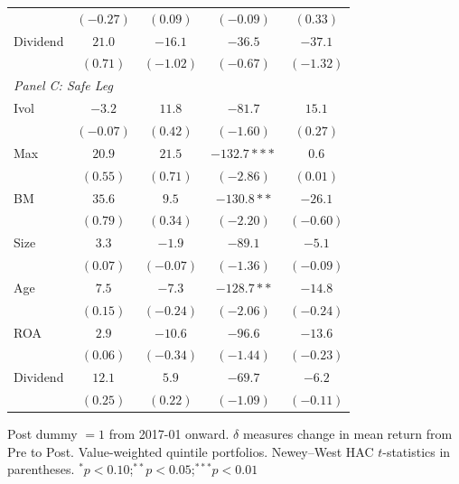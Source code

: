 \begin{tabular}{l c c c c}
 & $(-0.27)$ & $(0.09)$ & $(-0.09)$ & $(0.33)$ \\
Dividend & $21.0$ & $-16.1$ & $-36.5$ & $-37.1$ \\
 & $(0.71)$ & $(-1.02)$ & $(-0.67)$ & $(-1.32)$ \\
\midrule
\multicolumn{5}{l}{\textit{Panel C: Safe Leg}} \\
Ivol & $-3.2$ & $11.8$ & $-81.7$ & $15.1$ \\
 & $(-0.07)$ & $(0.42)$ & $(-1.60)$ & $(0.27)$ \\
Max & $20.9$ & $21.5$ & $-132.7***$ & $0.6$ \\
 & $(0.55)$ & $(0.71)$ & $(-2.86)$ & $(0.01)$ \\
BM & $35.6$ & $9.5$ & $-130.8**$ & $-26.1$ \\
 & $(0.79)$ & $(0.34)$ & $(-2.20)$ & $(-0.60)$ \\
Size & $3.3$ & $-1.9$ & $-89.1$ & $-5.1$ \\
 & $(0.07)$ & $(-0.07)$ & $(-1.36)$ & $(-0.09)$ \\
Age & $7.5$ & $-7.3$ & $-128.7**$ & $-14.8$ \\
 & $(0.15)$ & $(-0.24)$ & $(-2.06)$ & $(-0.24)$ \\
ROA & $2.9$ & $-10.6$ & $-96.6$ & $-13.6$ \\
 & $(0.06)$ & $(-0.34)$ & $(-1.44)$ & $(-0.23)$ \\
Dividend & $12.1$ & $5.9$ & $-69.7$ & $-6.2$ \\
 & $(0.25)$ & $(0.22)$ & $(-1.09)$ & $(-0.11)$ \\
\bottomrule
\end{tabular}
\vspace{4pt}
\begin{minipage}{0.9\textwidth}
\footnotesize
Post dummy $=1$ from 2017-01 onward. $\delta$ measures change in mean return from Pre to Post.
Value-weighted quintile portfolios. Newey--West HAC $t$-statistics in parentheses.
$^{*}p<0.10$;\quad $^{**}p<0.05$;\quad $^{***}p<0.01$
\end{minipage}